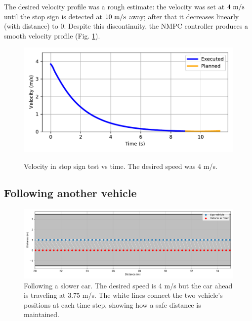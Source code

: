 \documentclass[letterpaper, 10 pt, conference]{ieeeconf}  %
\begin{document}
The desired velocity profile was a rough estimate: the velocity was set at $4\ \text{m}/\text{s}$ until the stop sign is detected at $10\ \text{m}/\text{s}$ away; after that it decreases linearly (with distance) to 0. Despite this discontinuity, the NMPC controller produces a smooth velocity profile (Fig. \ref{fig:stop_sign_velocity}).
 
 \begin{figure}[h!]
 	\centering
 	\includegraphics[width=0.8\linewidth]{figures/stop_sign_velocity.pdf}
 	\label{fig:stop_sign_velocity}
 	\caption{Velocity in stop sign test vs time. The desired speed was 4 m/s.}
 \end{figure}
 
  \subsection{Following another vehicle}
 
 
 \begin{figure}[h!]
 	\centering
 	\includegraphics[width=1.0\linewidth]{figures/vehicle_following.pdf}
 	\caption{Following a slower car. The desired speed is 4 m/s but the car ahead is traveling at 3.75 m/s. The white lines connect the two vehicle's positions at each time step, showing how a safe distance is maintained.}
        \label{fig:vehicle_following}
 \end{figure}
 
\end{document}
